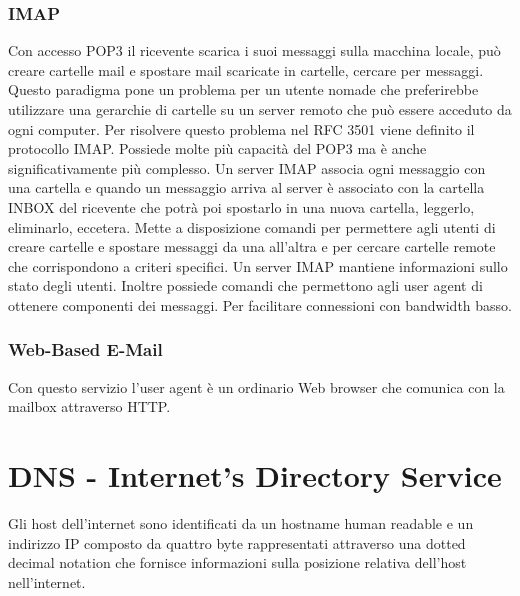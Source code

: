 \subsubsection{IMAP}
Con accesso POP3 il ricevente scarica i suoi messaggi sulla macchina locale, pu\`o creare cartelle mail e spostare mail scaricate in cartelle, cercare per messaggi. Questo paradigma pone un problema per 
un utente nomade che preferirebbe utilizzare una gerarchie di cartelle su un server remoto che pu\`o essere acceduto da ogni computer. Per risolvere questo problema nel RFC 3501 viene definito il protocollo 
IMAP. Possiede molte pi\`u capacit\`a del POP3 ma \`e anche significativamente pi\`u complesso. Un server IMAP associa ogni messaggio con una cartella e quando un messaggio arriva al server \`e associato 
con la cartella INBOX del ricevente che potr\`a poi spostarlo in una nuova cartella, leggerlo, eliminarlo, eccetera. Mette a disposizione comandi per permettere agli utenti di creare cartelle e spostare messaggi
da una all'altra e per cercare cartelle remote che corrispondono a criteri specifici. Un server IMAP mantiene informazioni sullo stato degli utenti. Inoltre possiede comandi che permettono agli user agent di
ottenere componenti dei messaggi. Per facilitare connessioni con bandwidth basso. 
\subsubsection{Web-Based E-Mail}
Con questo servizio l'user agent \`e un ordinario Web browser che comunica con la mailbox attraverso HTTP. 
\section{DNS - Internet's Directory Service}
Gli host dell'internet sono identificati da un hostname human readable e un indirizzo IP composto da quattro byte rappresentati
attraverso una dotted decimal notation che fornisce informazioni sulla posizione relativa dell'host nell'internet.
